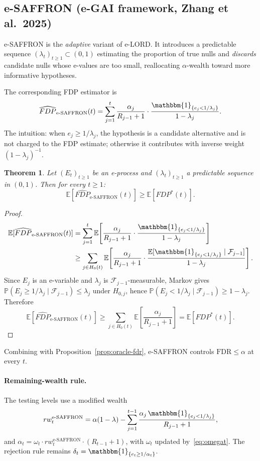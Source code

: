 \documentclass[11pt,a4paper]{article}
\theoremstyle{plain}
\newtheorem{theorem}{Theorem}[section]
\theoremstyle{definition}
\theoremstyle{remark}
\newcommand{\E}{\mathbb{E}}
\newcommand{\Prob}{\mathbb{P}}
\newcommand{\ind}{\mathbbm{1}}
\newcommand{\FDR}{\mathrm{FDR}}
\begin{document}
\subsection{e-SAFFRON (e-GAI framework, Zhang et al.\ 2025)}
\label{sec:esaffron}

e-SAFFRON is the \emph{adaptive} variant of e-LORD. It introduces a
predictable sequence $(\lambda_t)_{t \geq 1} \subset (0,1)$ estimating the
proportion of true nulls and \emph{discards} candidate nulls whose e-values
are too small, reallocating $\alpha$-wealth toward more informative
hypotheses.

The corresponding FDP estimator is
\[
  \widehat{FDP}_{\text{e-SAFFRON}}(t)
    = \sum_{j=1}^{t} \frac{\alpha_j}{R_{j-1} + 1}
      \cdot \frac{\ind_{\{e_j < 1/\lambda_j\}}}{1 - \lambda_j}.
\]
The intuition: when $e_j \geq 1/\lambda_j$, the hypothesis is a candidate
alternative and is not charged to the FDP estimate; otherwise it contributes
with inverse weight $(1 - \lambda_j)^{-1}$.

\begin{theorem}
Let $(E_t)_{t \geq 1}$ be an e-process and $(\lambda_t)_{t \geq 1}$ a
predictable sequence in $(0,1)$. Then for every $t \geq 1$:
\[
  \E[\widehat{FDP}_{\text{e-SAFFRON}}(t)] \geq \E[FDP^*(t)].
\]
\end{theorem}

\begin{proof}
\begin{align*}
\E[\widehat{FDP}_{\text{e-SAFFRON}}(t)]
  &= \sum_{j=1}^{t} \E\!\left[\frac{\alpha_j}{R_{j-1}+1} \cdot \frac{\ind_{\{e_j < 1/\lambda_j\}}}{1 - \lambda_j}\right]\\
  &\geq \sum_{j \in H_0(t)} \E\!\left[\frac{\alpha_j}{R_{j-1}+1}
      \cdot \frac{\E[\ind_{\{e_j < 1/\lambda_j\}} \mid \mathcal{F}_{j-1}]}{1 - \lambda_j}\right].
\end{align*}
Since $E_j$ is an e-variable and $\lambda_j$ is $\mathcal{F}_{j-1}$-measurable,
Markov gives $\Prob(E_j \geq 1/\lambda_j \mid \mathcal{F}_{j-1}) \leq \lambda_j$
under $H_{0,j}$, hence
$\Prob(E_j < 1/\lambda_j \mid \mathcal{F}_{j-1}) \geq 1 - \lambda_j$.
Therefore
\[
  \E[\widehat{FDP}_{\text{e-SAFFRON}}(t)]
    \geq \sum_{j \in H_0(t)} \E\!\left[\frac{\alpha_j}{R_{j-1}+1}\right]
    = \E[FDP^*(t)].
\]
\end{proof}

Combining with Proposition~\ref{prop:oracle-fdr}, e-SAFFRON controls
$\FDR \leq \alpha$ at every $t$.

\paragraph{Remaining-wealth rule.}
The testing levels use a modified wealth
\[
  rw_t^{\text{e-SAFFRON}} = \alpha(1 - \lambda)
    - \sum_{j=1}^{t-1} \frac{\alpha_j\,\ind_{\{e_j < 1/\lambda_j\}}}{R_{j-1}+1},
\]
and $\alpha_t = \omega_t \cdot rw_t^{\text{e-SAFFRON}} \cdot (R_{t-1}+1)$,
with $\omega_t$ updated by~\eqref{eq:omegat}. The rejection rule remains
$\delta_t = \ind_{\{e_t \geq 1/\alpha_t\}}$.
\end{document}
